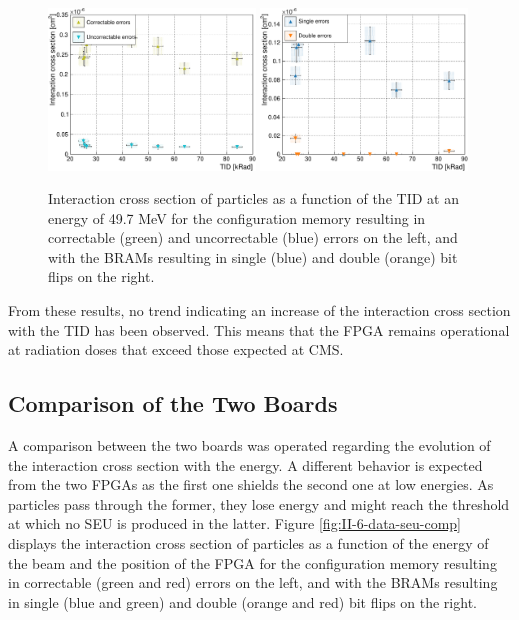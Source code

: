       \begin{figure}[h!]
        \centering
        \includegraphics[width=0.49\textwidth]{img/plots/cDose_SEM-crop}
        \includegraphics[width=0.49\textwidth]{img/plots/cDose_BRAM-crop}
        \caption{Interaction cross section of particles as a function of the TID at an energy of 49.7 MeV for the configuration memory resulting in correctable (green) and uncorrectable (blue) errors on the left, and with the BRAMs resulting in single (blue) and double (orange) bit flips on the right.}
        \label{fig:II-6-data-seu-tid}
      \end{figure}

      From these results, no trend indicating an increase of the interaction cross section with the TID has been observed. This means that the FPGA remains operational at radiation doses that exceed those expected at CMS.

    \subsection{Comparison of the Two Boards}

      A comparison between the two boards was operated regarding the evolution of the interaction cross section with the energy. A different behavior is expected from the two FPGAs as the first one shields the second one at low energies. As particles pass through the former, they lose energy and might reach the threshold at which no SEU is produced in the latter. Figure \ref{fig:II-6-data-seu-comp} displays the interaction cross section of particles as a function of the energy of the beam and the position of the FPGA for the configuration memory resulting in correctable (green and red) errors on the left, and with the BRAMs resulting in single (blue and green) and double (orange and red) bit flips on the right. \\

